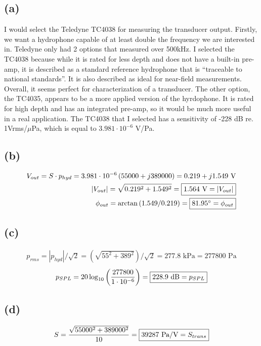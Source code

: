 \documentclass[12 pt]{article}
\begin{document}
\subsection*{(a)}
I would select the Teledyne TC4038 for measuring the transducer output. Firstly, we want a hydrophone capable of at
least double the frequency we are interested in. Teledyne only had 2 options that measured over 500kHz. I selected the
TC4038 because while it is rated for less depth and does not have a built-in pre-amp, it is described as a standard
reference hydrophone that is ``traceable to national standards''. It is also described as ideal for near-field
measurements. Overall, it seems perfect for characterization of a transducer. The other option, the TC4035, appears to
be a more applied version of the hyrdophone. It is rated for high depth and has an integrated pre-amp, so it would be
much more useful in a real application. The TC4038 that I selected has a sensitivity of -228 dB re. 1Vrms/$\mu$Pa, which
is equal to $3.981\cdot10^{-6}$ V/Pa.

\subsection*{(b)}
\begin{align*}
    V_{out}=S\cdot p_{hyd}=3.981\cdot10^{-6}\left(55000+j389000\right)=0.219+j1.549\text{ V} \\
    |V_{out}|=\sqrt{0.219^2 + 1.549^2}=\fbox{$1.564\text{ V}=|V_{out}|$} \\
    \phi_{out}=\arctan\left(1.549/0.219\right)=\fbox{$81.95^{\circ}=\phi_{out}$}
\end{align*}

\subsection*{(c)}
\begin{align*}
    p_{rms}=|p_{hyd}|/\sqrt{2}=\left(\sqrt{55^2+389^2}\right)/\sqrt{2}=277.8\text{ kPa}=277800\text{ Pa}
\end{align*}
\begin{align*}
    p_{SPL}=20\log_{10}\left(\frac{277800}{1\cdot10^{-6}}\right)=\fbox{$228.9\text{ dB}=p_{SPL}$}
\end{align*}

\subsection*{(d)}
\begin{align*}
    S=\frac{\sqrt{55000^2+389000^2}}{10}=\fbox{$39287\text{ Pa/V}=S_{trans}$}
\end{align*}
\end{document}
